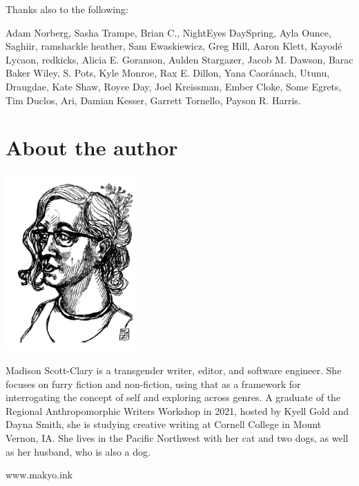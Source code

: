 Thanks also to the following:

Adam Norberg,
Sasha Trampe,
Brian C.,
NightEyes DaySpring,
Ayla Ounce,
Saghiir,
ramshackle heather,
Sam Ewaskiewicz,
Greg Hill,
Aaron Klett,
Kayodé Lycaon,
redkicks,
Alicia E. Goranson,
Aulden Stargazer,
Jacob M. Dawson,
Barac Baker Wiley,
S. Pots,
Kyle Monroe,
Rax E. Dillon,
Yana Caoránach,
Utunu,
Draugdae,
Kate Shaw,
Royce Day,
Joel Kreissman,
Ember Cloke,
Some Egrets,
Tim Duclos,
Ari,
Damian Kesser,
Garrett Tornello,
Payson R. Harris.

\chapter*{About the author}

\begin{center}
  \includegraphics[width=2in]{content/headshot.png}
\end{center}

\noindent Madison Scott-Clary is a transgender writer, editor, and software engineer. She focuses on furry fiction and non-fiction, using that as a framework for interrogating the concept of self and exploring across genres. A graduate of the Regional Anthropomorphic Writers Workshop in 2021, hosted by Kyell Gold and Dayna Smith, she is studying creative writing at Cornell College in Mount Vernon, IA. She lives in the Pacific Northwest with her cat and two dogs, as well as her husband, who is also a dog.

\begin{center}
    www.makyo.ink
\end{center}

\vfill
